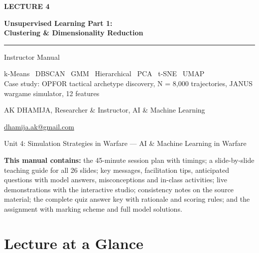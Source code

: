 \documentclass[11pt]{article}
\begin{document}
\begin{titlepage}\centering\vspace*{2.2cm}
{\color{AccN}\large\bfseries LECTURE 4\par}\vspace{0.6cm}
{\color{NavyN}\Huge\bfseries Unsupervised Learning Part 1:\\Clustering \& Dimensionality Reduction\par}\vspace{0.6cm}
{\color{AccN}\rule{0.7\textwidth}{1.5pt}}\par\vspace{0.6cm}
{\LARGE Instructor Manual\par}\vspace{0.4cm}
{\large\begin{minipage}{0.85\textwidth}\centering k-Means \textbullet\ DBSCAN \textbullet\ GMM \textbullet\ Hierarchical \textbullet\ PCA \textbullet\ t-SNE \textbullet\ UMAP\\Case study: OPFOR tactical archetype discovery, N = 8,000 trajectories, JANUS wargame simulator, 12 features\end{minipage}\par}\vspace{2cm}
{\large AK DHAMIJA, Researcher \& Instructor, AI \& Machine Learning\par}\vspace{0.2cm}
{\normalsize \href{mailto:dhamija.ak@gmail.com}{dhamija.ak@gmail.com} \quad\textbullet{}\par}\vspace{0.3cm}
{Unit 4: Simulation Strategies in Warfare --- AI \& Machine Learning in Warfare\par}\vfill
\begin{tcolorbox}[colback=NavyN!4,colframe=NavyN,boxrule=0.6pt,arc=2pt,width=0.9\textwidth]\small
\textbf{This manual contains:} the 45-minute session plan with timings; a slide-by-slide teaching guide for all 26 slides; key messages, facilitation tips, anticipated questions with model answers, misconceptions and in-class activities; live demonstrations with the interactive studio; consistency notes on the source material; the complete quiz answer key with rationale and scoring rules; and the assignment with marking scheme and full model solutions.
\end{tcolorbox}
\end{titlepage}
\tableofcontents\newpage


\section{Lecture at a Glance}
\end{document}
